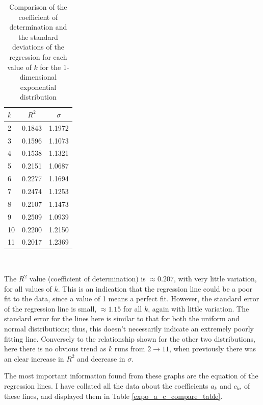 \documentclass[12pt]{report}
\begin{document}
\begin{table}
\caption{Comparison of the coefficient of determination and the standard deviations of the regression for each value of $k$ for the 1-dimensional exponential distribution} \label{expo_rsq}
\begin{center}
\begin{tabular}{| l | c c |} 
\toprule
$k$ & $R^2$ & $\sigma$ \\
\midrule[1pt]
2     & 0.1843    & 1.1972   \\
3     & 0.1596    & 1.1073   \\
4     & 0.1538    & 1.1321   \\
5     & 0.2151    & 1.0687   \\
6     & 0.2277    & 1.1694   \\
7     & 0.2474    & 1.1253   \\
8     & 0.2107    & 1.1473   \\
9     & 0.2509    & 1.0939   \\
10    & 0.2200    & 1.2150   \\
11    & 0.2017    & 1.2369   \\
\hline
\end{tabular}
\\[10pt]
\end{center}
\end{table}

The $R^2$ value (coefficient of determination) is $\approx 0.207$, with very little variation, for all values of $k$. This is an indication that the regression line could be a poor fit to the data, since a value of 1 means a perfect fit. However, the standard error of the regression line is small, $\approx 1.15$ for all $k$, again with little variation. The standard error for the lines here is similar to that for both the uniform and normal distributions; thus, this doesn't necessarily indicate an extremely poorly fitting line. Conversely to the relationship shown for the other two distributions, here there is no obvious trend as $k$ runs from $2 \to 11$, when previously there was an clear increase in $R^2$ and decrease in $\sigma$.

The most important information found from these graphs are the equation of the regression lines. I have collated all the data about the coefficients $a_{k}$ and $c_{k}$, of these lines, and displayed them in Table \ref{expo_a_c_compare_table}.
\end{document}

